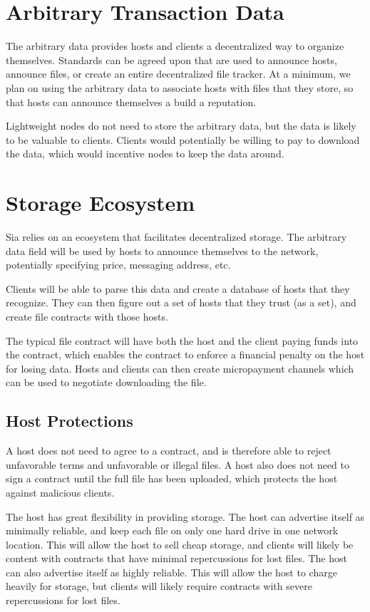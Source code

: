 \documentclass[twocolumn]{article}
\begin{document}
\section{Arbitrary Transaction Data}
The arbitrary data provides hosts and clients a decentralized way to organize themselves.
Standards can be agreed upon that are used to announce hosts, announce files, or create an entire decentralized file tracker.
At a minimum, we plan on using the arbitrary data to associate hosts with files that they store, so that hosts can announce themselves a build a reputation.

Lightweight nodes do not need to store the arbitrary data, but the data is likely to be valuable to clients.
Clients would potentially be willing to pay to download the data, which would incentive nodes to keep the data around.

\section{Storage Ecosystem}
Sia relies on an ecosystem that facilitates decentralized storage.
The arbitrary data field will be used by hosts to announce themselves to the network, potentially specifying price, messaging address, etc.

Clients will be able to parse this data and create a database of hosts that they recognize.
They can then figure out a set of hosts that they trust (as a set), and create file contracts with those hosts.

The typical file contract will have both the host and the client paying funds into the contract, which enables the contract to enforce a financial penalty on the host for losing data.
Hosts and clients can then create micropayment channels \cite{mpc} which can be used to negotiate downloading the file.

\subsection{Host Protections}
A host does not need to agree to a contract, and is therefore able to reject unfavorable terms and unfavorable or illegal files.
A host also does not need to sign a contract until the full file has been uploaded, which protects the host against malicious clients.

The host has great flexibility in providing storage.
The host can advertise itself as minimally reliable, and keep each file on only one hard drive in one network location.
This will allow the host to sell cheap storage, and clients will likely be content with contracts that have minimal repercussions for lost files.
The host can also advertise itself as highly reliable.
This will allow the host to charge heavily for storage, but clients will likely require contracts with severe repercussions for lost files.
\end{document}
